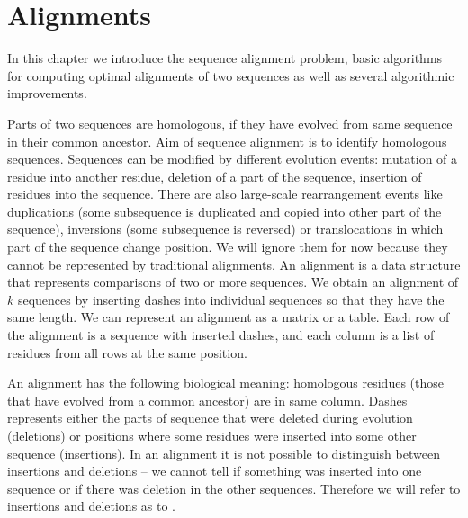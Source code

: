 \chapter{Alignments}
\label{CHAPTER:ALIGNMENT}
In this chapter we introduce the sequence alignment problem, basic algorithms
for computing optimal alignments of two sequences as well as several
algorithmic improvements.

Parts of two sequences are homologous, if they have evolved from same sequence
in their common ancestor. Aim of sequence alignment is to identify homologous
sequences. Sequences can be modified by different evolution events:
mutation of a residue into another residue, deletion of a part of the sequence,
insertion of residues into the sequence. There are also large-scale
rearrangement events like duplications (some subsequence is duplicated and
copied into other part of the sequence), inversions (some subsequence is
reversed) or translocations in which part of the sequence change position.  We will
ignore them for now because they cannot be represented by traditional
alignments. An alignment is a data structure that represents comparisons of two
or more sequences. We obtain an alignment of $k$ sequences by inserting dashes
into individual sequences so that they have the same length. We can represent an
alignment as a matrix or a table. Each row of the alignment is a sequence with
inserted dashes, and each column is a list of residues from all rows at the same
position.


An alignment has the following biological meaning: homologous residues (those that
have evolved from a common ancestor) are in same column. Dashes represents
either the parts of sequence that were deleted during evolution (deletions) or
positions where some residues were inserted into some other sequence
(insertions). In an alignment it is not possible to distinguish between insertions and
deletions -- we cannot tell if something was inserted into one sequence or if
there was deletion in the other sequences. Therefore we will refer to insertions
and deletions as to .


